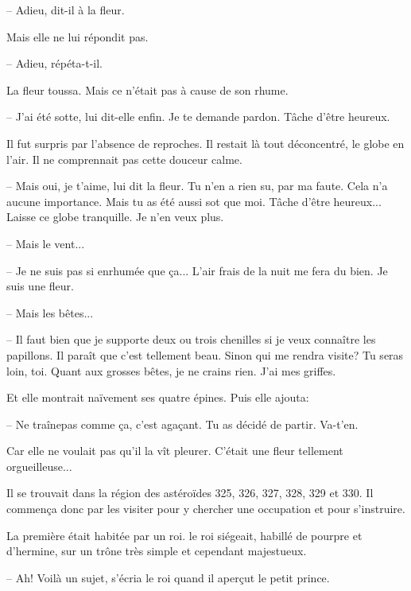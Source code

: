 \documentclass[a4paper]{report}
\begin{document}
-- Adieu, dit-il à la fleur.

Mais elle ne lui répondit pas.

-- Adieu, répéta-t-il.

La fleur toussa. Mais ce n'était pas à cause de son rhume.

-- J'ai été sotte, lui dit-elle enfin. Je te demande pardon. Tâche d'être heureux.

Il fut surpris par l'absence de reproches. Il restait là tout déconcentré, le globe en l'air. Il ne comprennait pas cette douceur calme.

-- Mais oui, je t'aime, lui dit la fleur. Tu n'en a rien su, par ma faute. Cela n'a aucune importance. Mais tu as été aussi sot que moi. Tâche d'être heureux... Laisse ce globe tranquille. Je n'en veux plus.

-- Mais le vent...

-- Je ne suis pas si enrhumée que ça... L'air frais de la nuit me fera du bien. Je suis une fleur.

-- Mais les bêtes...

-- Il faut bien que je supporte deux ou trois chenilles si je veux connaître les papillons. Il paraît que c'est tellement beau. Sinon qui me rendra visite? Tu seras loin, toi. Quant aux grosses bêtes, je ne crains rien. J'ai mes griffes.

Et elle montrait naïvement ses quatre épines. Puis elle ajouta:

-- Ne  traînepas comme ça, c'est agaçant. Tu as décidé de partir. Va-t'en.

Car elle ne voulait pas qu'il la vît pleurer. C'était une fleur tellement orgueilleuse...

\parachapter[X]{} %
Il se trouvait dans la région des astéroïdes 325, 326, 327, 328, 329 et 330. Il commença donc par les visiter pour y chercher une occupation et pour s'instruire.

La première était habitée par un roi. le roi siégeait, habillé de pourpre et d'hermine, sur un trône très simple et cependant majestueux.

-- Ah! Voilà un sujet, s'écria le roi quand il aperçut le petit prince.
\end{document}
